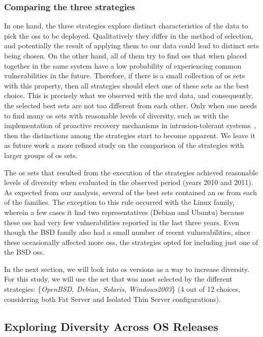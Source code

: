\subsubsection*{Comparing the three strategies}
In one hand, the three strategies explore distinct characteristics of the data to pick the \glspl{os} to be deployed. 
Qualitatively they differ in the method of selection, and potentially the result of applying them to our data could lead to distinct sets being chosen.
On the other hand, all of them try to find \glspl{os} that when placed together in the same system have a low probability of experiencing common vulnerabilities in the future. 
Therefore, if there is a small collection of \gls{os} sets with this property, then all strategies should elect one of these sets as the best choice. 
This is precisely what we observed with the \gls{nvd} data, and consequently, the selected best sets are not too different from each other.
Only when one needs to find many \gls{os} sets with reasonable levels of diversity, such as with the implementation of proactive recovery mechanisms in intrusion-tolerant systems~\cite{Castro:2002,Sousa:2010}, then the distinctions among the strategies start to become apparent.
We leave it as future work a more refined study on the comparison of the strategies with larger groups of \gls{os} sets.

The \gls{os} sets that resulted from the execution of the strategies achieved reasonable levels of diversity when evaluated in the observed period (years 2010 and 2011). 
As expected from our analysis, several of the best sets contained an \gls{os} from each of the families. 
The exception to this rule occurred with the Linux family, wherein a few cases it had two representatives (Debian and Ubuntu) because these \glspl{os} had very few vulnerabilities reported in the last three years. 
Even though the BSD family also had a small number of recent vulnerabilities, since these occasionally affected more \glspl{os}, the strategies opted for including just one of the BSD \glspl{os}.

In the next section, we will look into \gls{os} versions as a way to increase diversity. 
For this study, we will use the set that was most selected by the different strategies: \{\emph{OpenBSD, Debian, Solaris, Windows2003}\} (4 out of 12 choices, considering both Fat Server and Isolated Thin Server configurations).


\subsection{Exploring Diversity Across OS Releases}
\label{releases}


